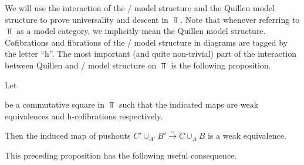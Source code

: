 We will use the interaction of the \Strom/ model structure and the Quillen model structure to prove universality and descent in $\Top$.
Note that whenever referring to $\Top$ as a model category, we implicitly mean the Quillen model structure. 
Cofibrations and fibrations of the \Strom/ model structure in diagrams are tagged by the letter ``h''.
The most important (and quite non-trivial) part of the interaction between Quillen and \Strom/ model structure on $\Top$ is the following proposition.
\begin{prop}\label{prop:poOfWeIsWe}
    Let 
    \begin{center}
    \end{center}
    be a commutative square in $\Top$ such that the indicated maps are weak equivalences and h-cofibrations respectively.

    Then the induced map of pushouts $C'\cup_{A'}B'\xrightarrow{\sim} C\cup_AB$ is a weak equivalence.
    \begin{reference}
        \cite[Proposition 1.1]{hcolim_bar}
    \end{reference}
\end{prop}
This preceding proposition has the following useful consequence.
